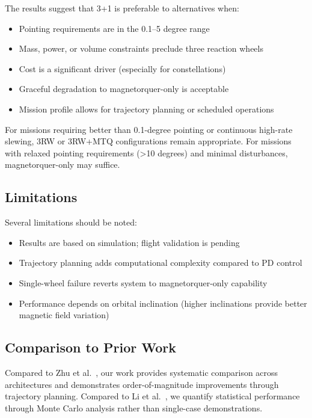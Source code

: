 \documentclass[9pt]{extarticle}
\begin{document}
The results suggest that 3+1 is preferable to alternatives when:

\begin{itemize}
    \item Pointing requirements are in the 0.1--5 degree range
    \item Mass, power, or volume constraints preclude three reaction wheels
    \item Cost is a significant driver (especially for constellations)
    \item Graceful degradation to magnetorquer-only is acceptable
    \item Mission profile allows for trajectory planning or scheduled operations
\end{itemize}

For missions requiring better than 0.1-degree pointing or continuous high-rate slewing, 3RW or 3RW+MTQ configurations remain appropriate. For missions with relaxed pointing requirements (>10 degrees) and minimal disturbances, magnetorquer-only may suffice.

\subsection{Limitations}

Several limitations should be noted:

\begin{itemize}
    \item Results are based on simulation; flight validation is pending
    \item Trajectory planning adds computational complexity compared to PD control
    \item Single-wheel failure reverts system to magnetorquer-only capability
    \item Performance depends on orbital inclination (higher inclinations provide better magnetic field variation)
\end{itemize}

\subsection{Comparison to Prior Work}

Compared to Zhu et al.~\cite{zhu2023attitude}, our work provides systematic comparison across architectures and demonstrates order-of-magnitude improvements through trajectory planning. Compared to Li et al.~\cite{li2013design}, we quantify statistical performance through Monte Carlo analysis rather than single-case demonstrations.
\end{document}
